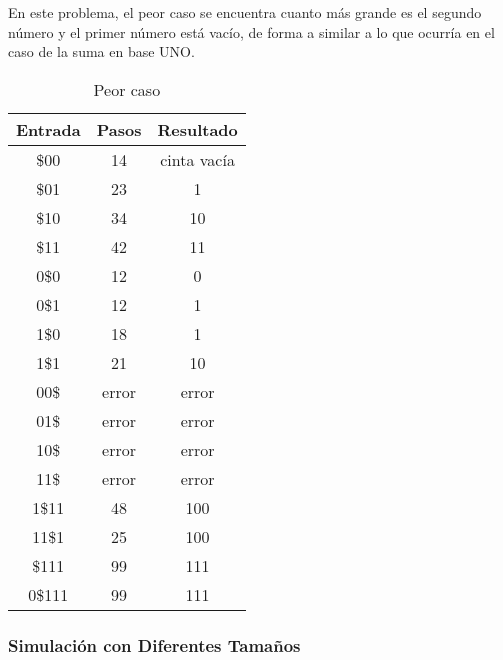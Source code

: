 \documentclass{uc3mpracticas}
\begin{document}
  En este problema, el peor caso se encuentra cuanto más grande es el segundo número y el primer número está vacío, de forma a similar a lo que ocurría en el caso de la suma en base UNO.

  \begin{table}[!h]
    \centering
  \begin{tabular}{|c|c|c|}
  \hline
  \textbf{Entrada} & \textbf{Pasos} & \textbf{Resultado} \\ \hline
  \$00             & 14             & cinta vacía        \\ \hline
  \$01             & 23             & 1                  \\ \hline
  \$10             & 34             & 10                 \\ \hline
  \$11             & 42             & 11                 \\ \hline
  0\$0             & 12             & 0                  \\ \hline
  0\$1             & 12             & 1                  \\ \hline
  1\$0             & 18             & 1                  \\ \hline
  1\$1             & 21             & 10                 \\ \hline
  00\$             & error          & error              \\ \hline
  01\$             & error          & error              \\ \hline
  10\$             & error          & error              \\ \hline
  11\$             & error          & error              \\ \hline
  1\$11            & 48             & 100                \\ \hline
  11\$1            & 25             & 100                \\ \hline
  \$111            & 99             & 111                \\ \hline
  0\$111           & 99             & 111                \\ \hline
  \end{tabular}
  \caption{Peor caso}
  \end{table}


  \subsubsection{Simulación con Diferentes Tamaños}
\end{document}
